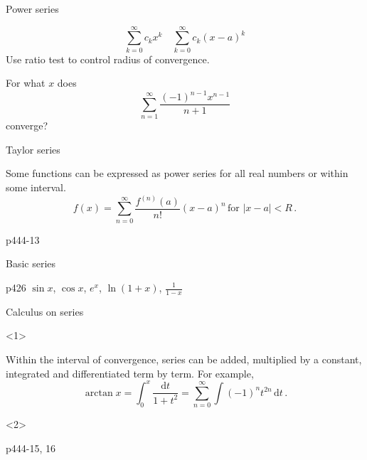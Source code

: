 \begin{frame}{Power series}


\[
\sum_{k=0}^{\infty}c_{k}x^{k}\quad\sum_{k=0}^{\infty}c_{k}\left(x-a\right)^{k}
\]
Use ratio test to control radius of convergence.



\begin{example}
For what $x$ does
\[
\sum_{n=1}^{\infty}\frac{\left(-1\right)^{n-1}x^{n-1}}{n+1}
\]
converge?
\end{example}

\end{frame}

\begin{frame}{Taylor series}


Some functions can be expressed as power series for all real numbers
or within some interval.
\[
f\left(x\right)=\sum_{n=0}^{\infty}\frac{f^{\left(n\right)}\left(a\right)}{n!}\left(x-a\right)^{n}\,\mbox{for }\left|x-a\right|<R\,.
\]

\begin{example}
p444-13
\end{example}

\end{frame}

\begin{frame}{Basic series}


p426 $\sin x$, $\cos x$, $e^{x}$, $\ln\left(1+x\right)$, $\frac{1}{1-x}$

\end{frame}

\begin{frame}{Calculus on series}

\begin{onlyenv}<1>


Within the interval of convergence, series can be added, multiplied
by a constant, integrated and differentiated \alert{term by term}.
For example,
\[
\arctan x=\int_{0}^{x}\frac{\mathrm{d}t}{1+t^{2}}=\sum_{n=0}^{\infty}\int\left(-1\right)^{n}t^{2n}\,\mathrm{d}t\,.
\]


\end{onlyenv}



\begin{onlyenv}<2>

\begin{example}
p444-15, 16
\end{example}

\end{onlyenv}

\end{frame}


